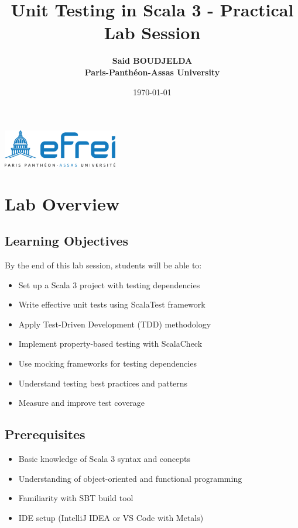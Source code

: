\documentclass[12pt,a4paper]{article}
\title{\textbf{Unit Testing in Scala 3 - Practical Lab Session}}
\author{\textbf{Said BOUDJELDA}\\ \textbf{Paris-Panthéon-Assas University}}
\date{\today}
\begin{document}
\maketitle

\begin{center}
  \includegraphics[width=5cm]{logo}
\end{center}

\tableofcontents
\newpage

\section{Lab Overview}

\subsection{Learning Objectives}
By the end of this lab session, students will be able to:
\begin{itemize}
  \item Set up a Scala 3 project with testing dependencies
  \item Write effective unit tests using ScalaTest framework
  \item Apply Test-Driven Development (TDD) methodology
  \item Implement property-based testing with ScalaCheck
  \item Use mocking frameworks for testing dependencies
  \item Understand testing best practices and patterns
  \item Measure and improve test coverage
\end{itemize}

\subsection{Prerequisites}
\begin{itemize}
  \item Basic knowledge of Scala 3 syntax and concepts
  \item Understanding of object-oriented and functional programming
  \item Familiarity with SBT build tool
  \item IDE setup (IntelliJ IDEA or VS Code with Metals)
\end{itemize}
\end{document}
